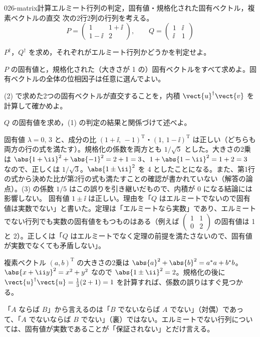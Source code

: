 \documentclass[uplatex,dvipdfmx,a4paper,11pt]{jsarticle}
\begin{document}
\mondaihen
{}
\begin{mondai}{026-matrix}{計算}{エルミート行列の判定，固有値・規格化された固有ベクトル，複素ベクトルの直交}
次の2行2列の行列を考える。
  \[ P=\begin{pmatrix}1 & 1+\ii\\ 1-\ii & 2\end{pmatrix},\qquad Q=\begin{pmatrix}1 & \ii\\ \ii & 1\end{pmatrix} \]
  \begin{shoumon}
    \item $P^{\dagger}$，$Q^{\dagger}$ を求め，それぞれがエルミート行列かどうかを判定せよ。
    \item $P$ の固有値と，規格化された（大きさが 1 の）固有ベクトルをすべて求めよ。固有ベクトルの全体の位相因子は任意に選んでよい。
    \item (2) で求めた2つの固有ベクトルが直交することを，内積 $\vect{u}^{\dagger}\vect{v}$ を計算して確かめよ。
    \item $Q$ の固有値を求め，(1) の判定の結果と関係づけて述べよ。
  \end{shoumon}

\begin{kotaeran}
   固有値 $\lambda=0,\,3$ と、成分の比 $(1+\ii,\,-1)^{\mathrm{T}}$・$(1,\,1-\ii)^{\mathrm{T}}$ は正しい（どちらも両方の行の式を満たす）。規格化の係数を両方とも $1/\sqrt{5}$ とした。大きさの2乗は $\abs{1+\ii}^{2}+\abs{-1}^{2}=2+1=3$、$1+\abs{1-\ii}^{2}=1+2=3$ なので、正しくは $1/\sqrt{3}$。$\abs{1\pm\ii}^{2}$ を 4 としたことになる。また、第1行の式から決めた比が第2行の式も満たすことの確認が書かれていない（解答の論点）。(3) の係数 $1/5$ はこの誤りを引き継いだもので、内積が 0 になる結論には影響しない。
   固有値 $1\pm\ii$ は正しい。理由を「$Q$ はエルミートでないので固有値は実数でない」と書いた。定理は「エルミートなら実数」であり、エルミートでない行列でも実数の固有値をもつものはある（例えば $\begin{pmatrix}1&1\\0&2\end{pmatrix}$ の固有値は 1 と 2）。正しくは「$Q$ はエルミートでなく定理の前提を満たさないので、固有値が実数でなくても矛盾しない」。
\end{kotaeran}
\begin{rikai}
  \item 複素ベクトル $(a,b)^{\mathrm{T}}$ の大きさの2乗は $\abs{a}^{2}+\abs{b}^{2}=a^{*}a+b^{*}b$。$\abs{x+\ii y}^{2}=x^{2}+y^{2}$ なので $\abs{1\pm\ii}^{2}=2$。規格化の後に $\vect{u}^{\dagger}\vect{u}=\frac{1}{3}(2+1)=1$ を計算すれば、係数の誤りはすぐ見つかる。
  \item 「$A$ ならば $B$」から言えるのは「$B$ でないならば $A$ でない」（対偶）であって、「$A$ でないならば $B$ でない」（裏）ではない。エルミートでない行列については、固有値が実数であることが「保証されない」とだけ言える。
\end{rikai}
\end{mondai}
\end{document}
